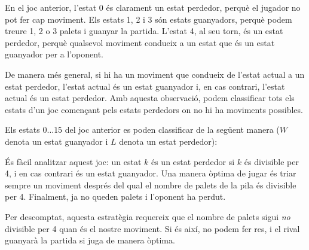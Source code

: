 En el joc anterior, l'estat 0 és clarament un estat perdedor, perquè
el jugador no pot fer cap moviment. Els estats 1, 2 i 3 són estats
guanyadors, perquè podem treure 1, 2 o 3 palets i guanyar la
partida. L'estat 4, al seu torn, és un estat perdedor, perquè
qualsevol moviment condueix a un estat que és un estat guanyador per a
l'oponent.

De manera més general, si hi ha un moviment que condueix de l'estat
actual a un estat perdedor, l'estat actual és un estat guanyador i, en
cas contrari, l'estat actual és un estat perdedor. Amb aquesta
observació, podem classificar tots els estats d'un joc començant pels
estats perdedors on no hi ha moviments possibles.

Els estats $0 \ldots 15$ del joc anterior es poden classificar de la
següent manera ($W$ denota un estat guanyador i $L$ denota un estat
perdedor):
\begin{center}
\end{center}


És fàcil analitzar aquest joc: un estat $k$ és un estat perdedor si
$k$ és divisible per 4, i en cas contrari és un estat guanyador. Una
manera òptima de jugar és triar sempre un moviment després del qual el
nombre de palets de la pila és divisible per 4. Finalment, ja no
queden palets i l'oponent ha perdut.

Per descomptat, aquesta estratègia requereix que el nombre de palets
sigui \emph{no} divisible per 4 quan és el nostre moviment. Si és
així, no podem fer res, i el rival guanyarà la partida si juga de
manera òptima.

